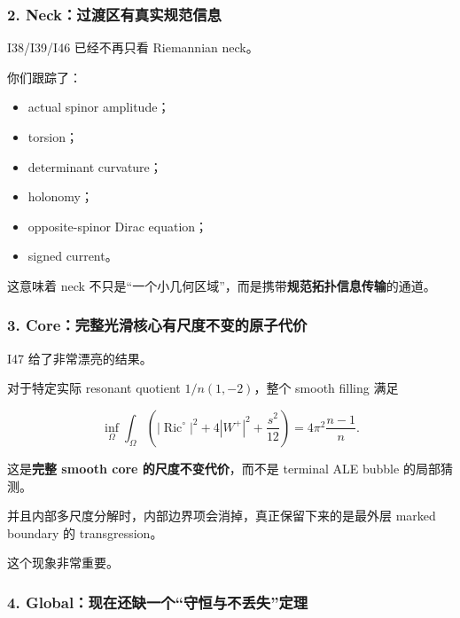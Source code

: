 \documentclass[
  10pt,
]{article}
\providecommand{\tightlist}{%
  \setlength{\itemsep}{0pt}\setlength{\parskip}{0pt}}
\providecommand{\Ric}{\operatorname{Ric}}
\begin{document}
\hypertarget{neckux8fc7ux6e21ux533aux6709ux771fux5b9eux89c4ux8303ux4fe1ux606f}{%
\subsubsection{2.
Neck：过渡区有真实规范信息}\label{neckux8fc7ux6e21ux533aux6709ux771fux5b9eux89c4ux8303ux4fe1ux606f}}

I38/I39/I46 已经不再只看 Riemannian neck。

你们跟踪了：

\begin{itemize}
\tightlist
\item
  actual spinor amplitude；
\item
  torsion；
\item
  determinant curvature；
\item
  holonomy；
\item
  opposite-spinor Dirac equation；
\item
  signed current。
\end{itemize}

这意味着 neck
不只是``一个小几何区域''，而是携带\textbf{规范拓扑信息传输}的通道。

\hypertarget{coreux5b8cux6574ux5149ux6ed1ux6838ux5fc3ux6709ux5c3aux5ea6ux4e0dux53d8ux7684ux539fux5b50ux4ee3ux4ef7}{%
\subsubsection{3.
Core：完整光滑核心有尺度不变的原子代价}\label{coreux5b8cux6574ux5149ux6ed1ux6838ux5fc3ux6709ux5c3aux5ea6ux4e0dux53d8ux7684ux539fux5b50ux4ee3ux4ef7}}

I47 给了非常漂亮的结果。

对于特定实际 resonant quotient \(1/n(1,-2)\)，整个 smooth filling 满足

\[
\inf_\Omega
\int_\Omega
\left(
|\Ric^\circ|^2+
4|W^+|^2+
\frac{s^2}{12}
\right)
=
4\pi^2\frac{n-1}{n}.
\]

这是\textbf{完整 smooth core 的尺度不变代价}，而不是 terminal ALE bubble
的局部猜测。

并且内部多尺度分解时，内部边界项会消掉，真正保留下来的是最外层 marked
boundary 的 transgression。

这个现象非常重要。

\hypertarget{globalux73b0ux5728ux8fd8ux7f3aux4e00ux4e2aux5b88ux6052ux4e0eux4e0dux4e22ux5931ux5b9aux7406}{%
\subsubsection{4.
Global：现在还缺一个``守恒与不丢失''定理}\label{globalux73b0ux5728ux8fd8ux7f3aux4e00ux4e2aux5b88ux6052ux4e0eux4e0dux4e22ux5931ux5b9aux7406}}
\end{document}

